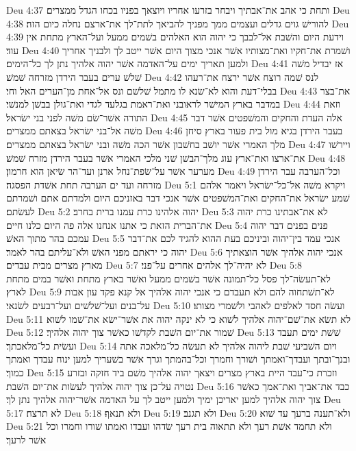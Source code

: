 Deu 4:37  ותחת כי אהב את־אבתיך ויבחר בזרעו אחריו ויוצאך בפניו בכחו הגדל ממצרים׃
Deu 4:38  להורישׁ גוים גדלים ועצמים ממך מפניך להביאך לתת־לך את־ארצם נחלה כיום הזה׃
Deu 4:39  וידעת היום והשׁבת אל־לבבך כי יהוה הוא האלהים בשׁמים ממעל ועל־הארץ מתחת אין עוד׃
Deu 4:40  ושׁמרת את־חקיו ואת־מצותיו אשׁר אנכי מצוך היום אשׁר ייטב לך ולבניך אחריך ולמען תאריך ימים על־האדמה אשׁר יהוה אלהיך נתן לך כל־הימים׃
Deu 4:41  אז יבדיל משׁה שׁלשׁ ערים בעבר הירדן מזרחה שׁמשׁ׃
Deu 4:42  לנס שׁמה רוצח אשׁר ירצח את־רעהו בבלי־דעת והוא לא־שׂנא לו מתמל שׁלשׁם ונס אל־אחת מן־הערים האל וחי׃
Deu 4:43  את־בצר במדבר בארץ המישׁר לראובני ואת־ראמת בגלעד לגדי ואת־גולן בבשׁן למנשׁי׃
Deu 4:44  וזאת התורה אשׁר־שׂם משׁה לפני בני ישׂראל׃
Deu 4:45  אלה העדת והחקים והמשׁפטים אשׁר דבר משׁה אל־בני ישׂראל בצאתם ממצרים׃
Deu 4:46  בעבר הירדן בגיא מול בית פעור בארץ סיחן מלך האמרי אשׁר יושׁב בחשׁבון אשׁר הכה משׁה ובני ישׂראל בצאתם ממצרים׃
Deu 4:47  ויירשׁו את־ארצו ואת־ארץ עוג מלך־הבשׁן שׁני מלכי האמרי אשׁר בעבר הירדן מזרח שׁמשׁ׃
Deu 4:48  מערער אשׁר על־שׂפת־נחל ארנן ועד־הר שׂיאן הוא חרמון׃
Deu 4:49  וכל־הערבה עבר הירדן מזרחה ועד ים הערבה תחת אשׁדת הפסגה׃
Deu 5:1  ויקרא משׁה אל־כל־ישׂראל ויאמר אלהם שׁמע ישׂראל את־החקים ואת־המשׁפטים אשׁר אנכי דבר באזניכם היום ולמדתם אתם ושׁמרתם לעשׂתם׃
Deu 5:2  יהוה אלהינו כרת עמנו ברית בחרב׃
Deu 5:3  לא את־אבתינו כרת יהוה את־הברית הזאת כי אתנו אנחנו אלה פה היום כלנו חיים׃
Deu 5:4  פנים בפנים דבר יהוה עמכם בהר מתוך האשׁ׃
Deu 5:5  אנכי עמד בין־יהוה וביניכם בעת ההוא להגיד לכם את־דבר יהוה כי יראתם מפני האשׁ ולא־עליתם בהר לאמר׃
Deu 5:6  אנכי יהוה אלהיך אשׁר הוצאתיך מארץ מצרים מבית עבדים׃
Deu 5:7  לא יהיה־לך אלהים אחרים על־פני׃
Deu 5:8  לא־תעשׂה־לך פסל כל־תמונה אשׁר בשׁמים ממעל ואשׁר בארץ מתחת ואשׁר במים מתחת לארץ׃
Deu 5:9  לא־תשׁתחוה להם ולא תעבדם כי אנכי יהוה אלהיך אל קנא פקד עון אבות על־בנים ועל־שׁלשׁים ועל־רבעים לשׂנאי׃
Deu 5:10  ועשׂה חסד לאלפים לאהבי ולשׁמרי מצותו׃
Deu 5:11  לא תשׂא את־שׁם־יהוה אלהיך לשׁוא כי לא ינקה יהוה את אשׁר־ישׂא את־שׁמו לשׁוא׃
Deu 5:12  שׁמור את־יום השׁבת לקדשׁו כאשׁר צוך יהוה אלהיך׃
Deu 5:13  שׁשׁת ימים תעבד ועשׂית כל־מלאכתך׃
Deu 5:14  ויום השׁביעי שׁבת ליהוה אלהיך לא תעשׂה כל־מלאכה אתה ובנך־ובתך ועבדך־ואמתך ושׁורך וחמרך וכל־בהמתך וגרך אשׁר בשׁעריך למען ינוח עבדך ואמתך כמוך׃
Deu 5:15  וזכרת כי־עבד היית בארץ מצרים ויצאך יהוה אלהיך משׁם ביד חזקה ובזרע נטויה על־כן צוך יהוה אלהיך לעשׂות את־יום השׁבת׃
Deu 5:16  כבד את־אביך ואת־אמך כאשׁר צוך יהוה אלהיך למען יאריכן ימיך ולמען ייטב לך על האדמה אשׁר־יהוה אלהיך נתן לך׃
Deu 5:17  לא תרצח׃
Deu 5:18  ולא תנאף׃
Deu 5:19  ולא תגנב׃
Deu 5:20  ולא־תענה ברעך עד שׁוא׃
Deu 5:21  ולא תחמד אשׁת רעך ולא תתאוה בית רעך שׂדהו ועבדו ואמתו שׁורו וחמרו וכל אשׁר לרעך׃
